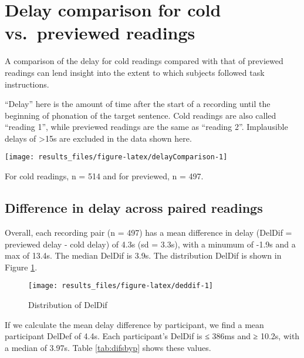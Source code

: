 \documentclass[]{tufte-handout}
\begin{document}
\section{Delay comparison for cold vs.~previewed
readings}\label{delay-comparison-for-cold-vs.previewed-readings}

A comparison of the delay for cold readings compared with that of
previewed readings can lend insight into the extent to which subjects
followed task instructions.

``Delay'' here is the amount of time after the start of a recording
until the beginning of phonation of the target sentence. Cold readings
are also called ``reading 1'', while previewed readings are the same as
``reading 2''. Implausible delays of \textgreater{}15s are excluded in
the data shown here.

\texttt{[image: results\_files/figure-latex/delayComparison-1]}

For cold readings, n = 514 and for previewed, n = 497.

\subsection{Difference in delay across paired
readings}\label{difference-in-delay-across-paired-readings}

Overall, each recording pair (n = 497) has a mean difference in delay
(DelDif = previewed delay - cold delay) of 4.3s (sd = 3.3s), with a
minumum of -1.9s and a max of 13.4s. The median DelDif is 3.9s. The
distribution DelDif is shown in Figure \ref{fig:deddif}.

\begin{figure}
\texttt{[image: results\_files/figure-latex/deddif-1]} \caption[Distribution of DelDif]{Distribution of DelDif}\label{fig:deddif}
\end{figure}

If we calculate the mean delay difference by participant, we find a mean
participant DelDef of 4.4s. Each participant's DelDif is ≤ 386ms and ≥
10.2s, with a median of 3.97s. Table \ref{tab:difsbyp} shows these
values.
\end{document}
